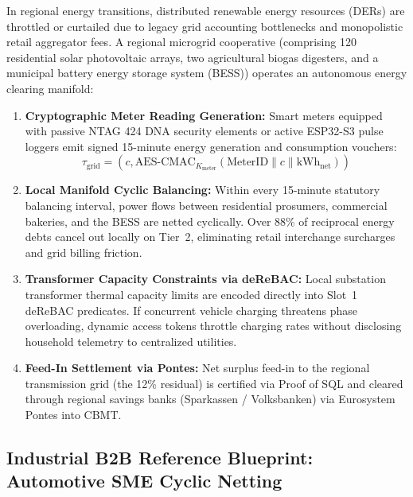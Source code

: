 \documentclass[a4paper,11pt,twoside,parskip=half-,headings=small]{scrartcl}
\begin{document}
In regional energy transitions, distributed renewable energy resources (DERs) are throttled
or curtailed due to legacy grid accounting bottlenecks and monopolistic retail aggregator fees.
A regional microgrid cooperative (comprising 120 residential solar photovoltaic arrays,
two agricultural biogas digesters, and a municipal battery energy storage system (BESS))
operates an autonomous energy clearing manifold:
\begin{enumerate}
  \item \textbf{Cryptographic Meter Reading Generation:} Smart meters equipped with passive
NTAG 424 DNA security elements or active ESP32-S3 pulse loggers emit signed 15-minute
energy generation and consumption vouchers:
\begin{equation}
\tau_{\text{grid}} = \left( c, \text{AES-CMAC}_{K_{\text{meter}}}(\text{MeterID} \parallel c \parallel \text{kWh}_{\text{net}}) \right)
\end{equation}
  \item \textbf{Local Manifold Cyclic Balancing:} Within every 15-minute statutory balancing
interval, power flows between residential prosumers, commercial bakeries, and the BESS
are netted cyclically. Over 88\% of reciprocal energy debts cancel out locally on Tier~2,
eliminating retail interchange surcharges and grid billing friction.
  \item \textbf{Transformer Capacity Constraints via deReBAC:} Local substation transformer
thermal capacity limits are encoded directly into Slot~1 deReBAC predicates. If concurrent
vehicle charging threatens phase overloading, dynamic access tokens throttle charging rates
without disclosing household telemetry to centralized utilities.
  \item \textbf{Feed-In Settlement via Pontes:} Net surplus feed-in to the regional transmission
grid (the 12\% residual) is certified via Proof of SQL and cleared through regional
savings banks (Sparkassen / Volksbanken) via Eurosystem Pontes into CBMT.
\end{enumerate}

\subsection{Industrial B2B Reference Blueprint: Automotive SME Cyclic Netting}
\label{sec:automotive_walkthrough}
\end{document}
